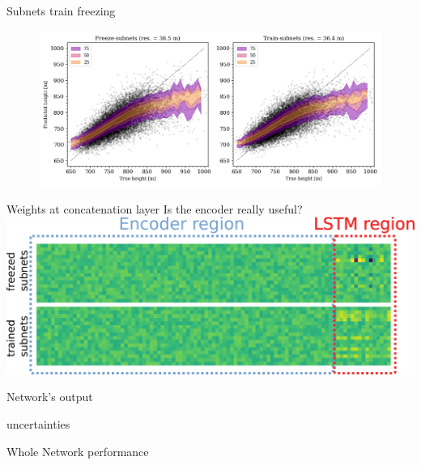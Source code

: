 \documentclass{beamer}
\begin{document}
    


\begin{frame}{Subnets train freezing}
    \begin{figure}
        \centering
        \includegraphics[width=\linewidth]{figures/comparison_freeze_diagonal.png}
    \end{figure}
\end{frame}


\begin{frame}{Weights at concatenation layer}
    Is the encoder really useful?
    \vfill
    \includegraphics[width=\linewidth]{figures/weights_comparison.png}
\end{frame}

\begin{frame}[fragile]{Network's output}


    
\end{frame}

\begin{frame}{uncertainties}
    
\end{frame}

\begin{frame}{Whole Network performance}

    
\end{frame}
\end{document}
